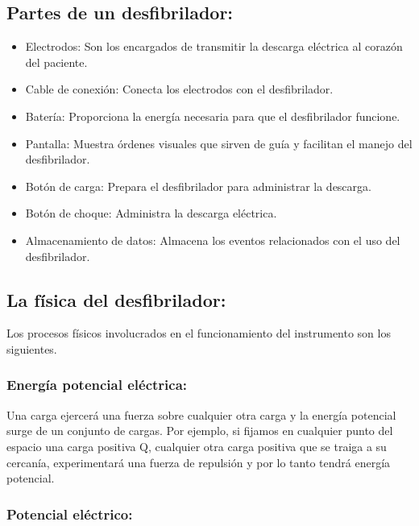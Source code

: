 \subsection{Partes de un desfibrilador:}
\begin{itemize}
    \item Electrodos: Son los encargados de transmitir la descarga eléctrica al corazón del paciente.
    \item Cable de conexión: Conecta los electrodos con el desfibrilador.
    \item Batería: Proporciona la energía necesaria para que el desfibrilador funcione.
    \item Pantalla: Muestra órdenes visuales que sirven de guía y facilitan el manejo del desfibrilador.
    \item Botón de carga: Prepara el desfibrilador para administrar la descarga.
    \item Botón de choque: Administra la descarga eléctrica.
    \item Almacenamiento de datos: Almacena los eventos relacionados con el uso del desfibrilador.
\end{itemize}

\subsection{La física del desfibrilador:}

Los procesos físicos involucrados en el funcionamiento del instrumento son los siguientes.

\subsubsection{Energía potencial eléctrica:}
Una carga ejercerá una fuerza sobre cualquier otra carga y la energía potencial surge de un conjunto de cargas. Por ejemplo, si fijamos en cualquier punto del espacio una carga positiva Q, cualquier otra carga positiva que se traiga a su cercanía, experimentará una fuerza de repulsión y por lo tanto tendrá energía potencial.

\subsubsection{Potencial eléctrico:}

